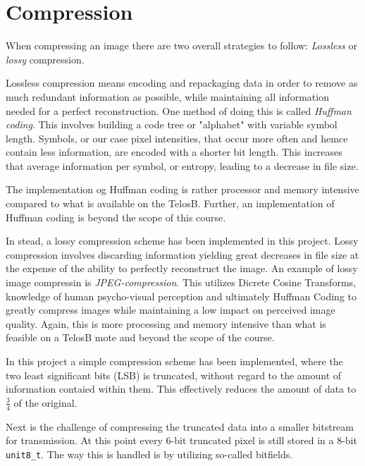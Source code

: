 \section{Compression}
When compressing an image there are two overall strategies to follow:
\emph{Lossless} or \emph{lossy} compression.

Lossless compression means encoding and repackaging data in order to remove as much redundant information as possible, while maintaining all information needed for a perfect reconstruction. 
One method of doing this is called \emph{Huffman coding}.
This involves building a code tree or "alphabet" with variable symbol length.
Symbols, or our case pixel intensities, that occur more often and hemce contain less information, are encoded with a shorter bit length. 
This increases that average information per symbol, or entropy, leading to a decrease in file size.

The implementation og Huffman coding is rather processor and memory intensive compared to what is available on the TelosB.
Further, an implementation of Huffman coding is beyond the scope of this course.

In stead, a lossy compression scheme has been implemented in this project.
Lossy compression involves discarding information yielding great decreases in file size at the expense of the ability to perfectly reconstruct the image.
An example of lossy image compressin is \emph{JPEG-compression}.
This utilizes Dicrete Cosine Transforms, knowledge of human psycho-visual perception and ultimately Huffman Coding to greatly compress images while maintaining a low impact on perceived image quality.
Again, this is more processing and memory intensive than what is feasible on a TelosB mote and beyond the scope of the course.

In this project a simple compression scheme has been implemented, where the two least significant  bits (LSB) is truncated, without regard to the amount of information contaied within them.
This effectively reduces the amount of data to $ \frac{3}{4} $ of the original. 

Next is the challenge of compressing the truncated data into a smaller bitstream for transmission.
At this point every 6-bit truncated pixel is still stored in a 8-bit \texttt{unit8\_t}.
The way this is handled is by utilizing so-called bitfields.


